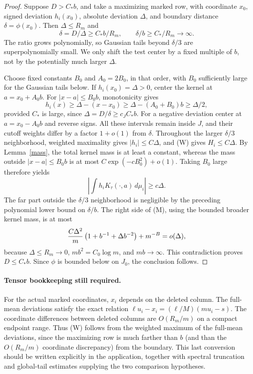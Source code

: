 \documentclass[11pt]{article}
\begin{document}
\begin{proof}
Suppose $D>C_*b$, and take a maximizing marked row, with coordinate
$x_0$, signed deviation $h_i(x_0)$, absolute deviation $\Delta$, and
boundary distance $\delta=\phi(x_0)$.
Then $\Delta\le R_m$ and
\[
 \delta=D/\Delta\ge C_*b/R_m,
 \qquad \delta/b\ge C_*/R_m\longrightarrow\infty.
\]
The ratio grows polynomially, so Gaussian tails beyond $\delta/3$
are superpolynomially small. We only shift the test center by a fixed
multiple of $b$, not by the potentially much larger $\Delta$.

Choose fixed constants $B_0$ and $A_0=2B_0$, in that order, with $B_0$
sufficiently large for the Gaussian tails below. If
$h_i(x_0)=\Delta>0$, center the kernel at $a=x_0+A_0b$.
For $|x-a|\le B_0b$, monotonicity gives
\[
 h_i(x)\ge\Delta-(x-x_0)
       \ge\Delta-(A_0+B_0)b\ge\Delta/2,
\]
provided $C_*$ is large, since $\Delta=D/\delta\ge c_JC_*b$.
For a negative deviation center at $a=x_0-A_0b$ and reverse signs.
All these intervals remain inside $J$, and their cutoff weights differ
by a factor $1+o(1)$ from $\delta$.
Throughout the larger $\delta/3$ neighborhood, weighted maximality
gives $|h_i|\le C\Delta$, and (W) gives $H_i\le C\Delta$.
By Lemma~\ref{mass}, the total kernel mass is at least a constant,
whereas the mass outside $|x-a|\le B_0b$ is at most
$C\exp(-cB_0^2)+o(1)$. Taking $B_0$ large therefore yields
\[
 \left|\int h_i K_\tau(\cdot,a)\,d\mu_i\right|
 \ge c\Delta.
\]
The far part outside the $\delta/3$ neighborhood is negligible by
the preceding polynomial lower bound on $\delta/b$.
The right side of (M), using the bounded broader kernel mass, is at most
\[
 {C\Delta^2\over m}\left(1+b^{-1}+\Delta b^{-2}\right)+m^{-B}
 =o(\Delta),
\]
because $\Delta\le R_m\to0$, $mb^2=C_0\log m$, and $mb\to\infty$.
This contradiction proves $D\le C_*b$. Since $\phi$ is bounded below
on $J_0$, the conclusion follows.
\end{proof}

\paragraph{Tensor bookkeeping still required.}
For the actual marked coordinates, $x_i$ depends on the deleted column.
The full-mean deviations satisfy the exact relation
$\ell u_i-x_i=(\ell/M)(m u_i-s)$.
The coordinate differences between deleted columns are $O(R_m/m)$
on a compact endpoint range. Thus (W) follows from the weighted maximum
of the full-mean deviations, since the maximizing row is much farther
than $b$ (and than the $O(R_m/m)$ coordinate discrepancy) from the
boundary. This last conversion should be written
explicitly in the application, together with spectral truncation and
global-tail estimates supplying the two comparison hypotheses.
\end{document}
